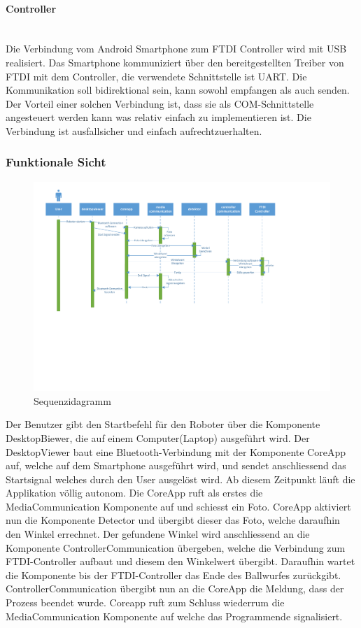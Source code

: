 		\paragraph{Controller}$~~$\vspace{2mm}\\
		Die Verbindung vom Android Smartphone zum FTDI Controller wird mit USB realisiert. 
		Das Smartphone kommuniziert über den bereitgestellten Treiber von FTDI mit dem Controller, die verwendete Schnittstelle ist UART. Die Kommunikation soll bidirektional sein, kann sowohl empfangen als auch senden. Der Vorteil einer solchen Verbindung ist, dass sie als COM-Schnittstelle angesteuert werden kann was relativ einfach zu implementieren ist. Die Verbindung ist ausfallsicher und einfach aufrechtzuerhalten.		
		
	\subsubsection{Funktionale Sicht}
	
	\begin{figure}[h!]
		\centering
		\includegraphics[width=1\textwidth,clip,trim= 11mm 88mm 55mm 8mm]
		{Enddokumentation/Loesungskonzept/Bilder/Sequenzdiagramm.pdf}
		\caption{Sequenzidagramm}		
	\end{figure}
Der Benutzer gibt den Startbefehl für den Roboter über die Komponente DesktopBiewer, die auf einem Computer(Laptop) ausgeführt wird. Der DesktopViewer baut eine Bluetooth-Verbindung mit der Komponente CoreApp auf, welche auf dem Smartphone ausgeführt wird, und sendet anschliessend das Startsignal welches durch den User ausgelöst wird. Ab diesem Zeitpunkt läuft die Applikation völlig autonom. Die CoreApp ruft als erstes die MediaCommunication Komponente auf und schiesst ein Foto. CoreApp aktiviert nun die Komponente Detector und übergibt dieser das Foto, welche daraufhin den Winkel errechnet. Der gefundene Winkel wird anschliessend an die Komponente ControllerCommunication übergeben, welche die Verbindung zum FTDI-Controller aufbaut und diesem den Winkelwert übergibt. Daraufhin wartet die Komponente bis der FTDI-Controller das Ende des Ballwurfes zurückgibt. ControllerCommunication übergibt nun an die CoreApp die Meldung, dass der Prozess beendet wurde. 
Coreapp ruft zum Schluss wiederrum die MediaCommunication Komponente auf welche das Programmende signalisiert.